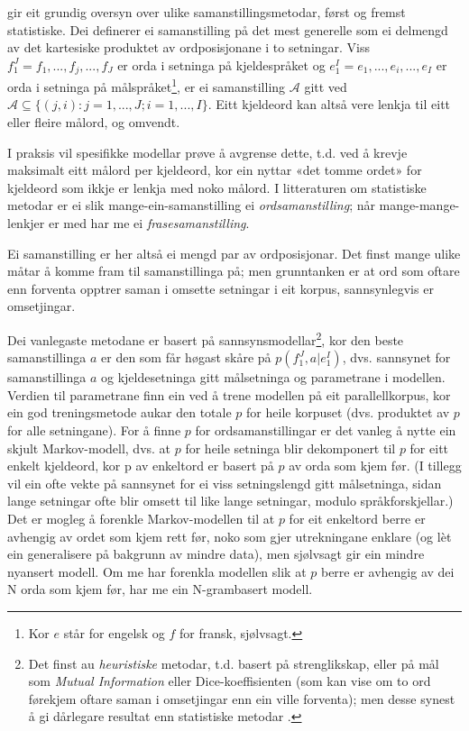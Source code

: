 \documentclass[11pt,a4paper,oneside,draft]{book}
\begin{document}
 \citet[s.~20--21]{och2003scv} gir eit grundig oversyn over ulike
 samanstillingsmetodar, først og fremst statistiske. Dei definerer ei
 samanstilling på det mest generelle som ei delmengd av det kartesiske
 produktet av ordposisjonane i to setningar. Viss
 $f_{1}^{J}=f_1,...,f_j,...,f_J$ er orda i setninga på kjeldespråket
 og $e_{1}^{I}=e_1,...,e_i,...,e_I$ er orda i setninga på
 målspråket\footnote{Kor $e$ står for engelsk og $f$ for fransk, sjølvsagt. }, er ei samanstilling $\mathcal{A}$ gitt ved
 $\mathcal{A}\subseteq \{(j,i): j=1,...,J;i=1,...,I\}$. Eitt kjeldeord
 kan altså vere lenkja til eitt eller fleire målord, og omvendt.

 I praksis vil spesifikke modellar prøve å avgrense dette, t.d. ved å
 krevje maksimalt eitt målord per kjeldeord, kor ein nyttar «det tomme
 ordet» for kjeldeord som ikkje er lenkja med noko målord. I
 litteraturen om statistiske metodar er ei slik
 mange-ein-samanstilling ei \emph{ordsamanstilling}; når
 mange-mange-lenkjer er med har me ei \emph{frasesamanstilling}.

 Ei samanstilling er her altså ei mengd par av ordposisjonar. Det
 finst mange ulike måtar å komme fram til samanstillinga på; men
 grunntanken er at ord som oftare enn forventa opptrer saman i omsette
 setningar i eit korpus, sannsynlegvis er omsetjingar.

 Dei vanlegaste metodane er basert på sannsynsmodellar\footnote{Det finst au \emph{heuristiske} metodar, t.d. basert på
        strenglikskap, eller på mål som \emph{Mutual Information} eller
        Dice-koeffisienten (som kan vise om to ord førekjem oftare
        saman i omsetjingar enn ein ville forventa); men desse synest
        å gi dårlegare resultat enn statistiske metodar
        \citep{och2003scv}. }, kor den
 beste samanstillinga $a$ er den som får høgast skåre på
 $p(f_1^J,a|e_1^I)$, dvs. sannsynet for samanstillinga $a$ og
 kjeldesetninga gitt målsetninga og parametrane i modellen. Verdien
 til parametrane finn ein ved å trene modellen på eit parallellkorpus,
 kor ein god treningsmetode aukar den totale $p$ for heile korpuset
 (dvs. produktet av $p$ for alle setningane).  For å finne $p$ for
 ordsamanstillingar er det vanleg å nytte ein skjult Markov-modell,
 dvs. at $p$ for heile setninga blir dekomponert til $p$ for eitt
 enkelt kjeldeord, kor p av enkeltord er basert på $p$ av orda som
 kjem før. (I tillegg vil ein ofte vekte på sannsynet for ei viss
 setningslengd gitt målsetninga, sidan lange setningar ofte blir
 omsett til like lange setningar, modulo språkforskjellar.) Det er
 mogleg å forenkle Markov-modellen til at $p$ for eit enkeltord berre
 er avhengig av ordet som kjem rett før, noko som gjer utrekningane
 enklare (og lèt ein generalisere på bakgrunn av mindre data), men
 sjølvsagt gir ein mindre nyansert modell. Om me har forenkla modellen
 slik at $p$ berre er avhengig av dei N orda som kjem før, har me ein
 N-grambasert modell.
 
\end{document}
